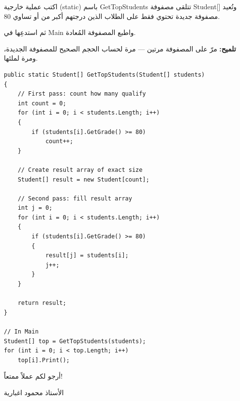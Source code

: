 \documentclass[14pt]{extarticle}
\begin{document}
\begin{enumerate}
اكتب عملية خارجية (\textenglish{static}) باسم \textenglish{GetTopStudents} تتلقى مصفوفة \textenglish{Student[]} وتُعيد مصفوفة جديدة تحتوي فقط على الطلاب الذين درجتهم أكبر من أو تساوي 80.

ثم استدعِها في \textenglish{Main} واطبع المصفوفة المُعادة.

\ifwithsols
\else
\begin{boxNote}
\textbf{تلميح:} مرّ على المصفوفة مرتين — مرة لحساب الحجم الصحيح للمصفوفة الجديدة، ومرة لملئها.
\end{boxNote}
\fi

\ifwithsols
{\small
\begin{boxSolution}
\begin{english}
\begin{verbatim}
public static Student[] GetTopStudents(Student[] students)
{
    // First pass: count how many qualify
    int count = 0;
    for (int i = 0; i < students.Length; i++)
    {
        if (students[i].GetGrade() >= 80)
            count++;
    }

    // Create result array of exact size
    Student[] result = new Student[count];

    // Second pass: fill result array
    int j = 0;
    for (int i = 0; i < students.Length; i++)
    {
        if (students[i].GetGrade() >= 80)
        {
            result[j] = students[i];
            j++;
        }
    }

    return result;
}

// In Main
Student[] top = GetTopStudents(students);
for (int i = 0; i < top.Length; i++)
    top[i].Print();
\end{verbatim}
\end{english}
\end{boxSolution}
}
\fi

\end{enumerate}

\ifwithsols
\else
\vspace{1em}
\begin{flushleft}
أرجو لكم عملاً ممتعاً!

الأستاذ محمود اغبارية
\end{flushleft}
\fi
\end{document}
